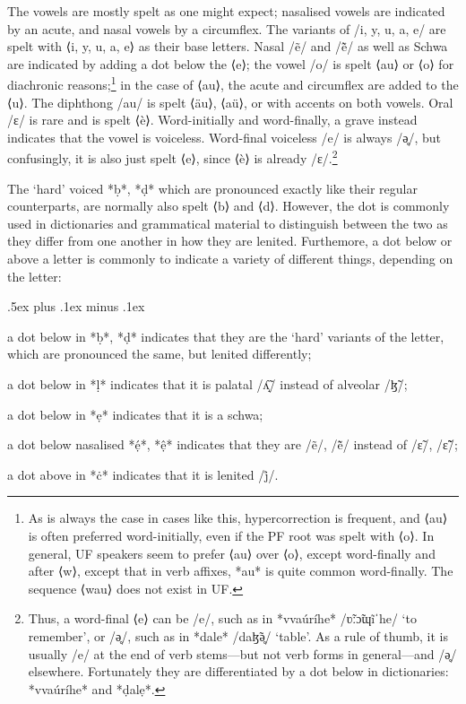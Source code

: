 \documentclass[a4paper, 12pt, oneside, final]{article}
\begin{document}
The vowels are mostly spelt as one might expect; nasalised vowels are indicated by an acute, and nasal vowels by a circumflex.
The variants of /i, y, u, a, e/ are spelt with ⟨i, y, u, a, e⟩ as their base letters. Nasal /ẽ/ and /ẽ̃/ as well as Schwa are
indicated by adding a dot below the ⟨e⟩; the vowel /o/ is spelt ⟨au⟩ or ⟨o⟩ for diachronic reasons;\footnote{As is always the
case in cases like this, hypercorrection is frequent, and ⟨au⟩ is often preferred word-initially, even if the
PF root was spelt with ⟨o⟩. In general, UF speakers seem to prefer ⟨au⟩ over ⟨o⟩, except word-finally and after ⟨w⟩, except
that in verb affixes, *au* is quite common word-finally. The sequence ⟨wau⟩ does not exist in UF.} in the case of
⟨au⟩, the acute and circumflex are added to the ⟨u⟩. The diphthong /au/ is spelt ⟨äu⟩, ⟨aü⟩, or with accents on both vowels. Oral
/ɛ/ is rare and is spelt ⟨è⟩. Word-initially and word-finally, a grave instead indicates that the vowel is voiceless. Word-final
voiceless /e/ is always /ə̥/, but confusingly, it is also just spelt ⟨e⟩, since ⟨è⟩ is already /ɛ/.\footnote{Thus, a word-final ⟨e⟩
can be /e/, such as in *vvaúríhe* /ʋ̃ːɔ̃ɰĩˈhe/ ‘to remember’, or /ə̥/, such as in *dale* /daɮ̃ə̥/ ‘table’. As a rule of thumb, it is
usually /e/ at the end of verb stems—but not verb forms in general—and /ə̥/ elsewhere. Fortunately they are differentiated by a
dot below in dictionaries: *vvaúríhe* and *ḍalẹ*.}

The ‘hard’ voiced *ḅ*, *ḍ* which are pronounced exactly like their regular counterparts, are normally also spelt ⟨b⟩ and
⟨d⟩. However, the dot is commonly used in dictionaries and grammatical material to distinguish between the two
as they differ from one another in how they are lenited. Furthemore, a dot below or above a letter is commonly to indicate
a variety of different things, depending on the letter:
\begin{items}\itemsep .5ex plus .1ex minus .1ex\relax
\item a dot below in *ḅ*, *ḍ* indicates that they are the ‘hard’ variants of the letter, which are pronounced
      the same, but lenited differently;
\item a dot below in *ḷ* indicates that it is palatal /ʎ̝̃/ instead of alveolar /ɮ̃/;
\item a dot below in *ẹ* indicates that it is a schwa;
\item a dot below nasalised *ẹ́*, *ệ* indicates that they are /ẽ/, /ẽ̃/ instead of /ɛ̃/, /ɛ̃̃/;
\item a dot above in *ċ* indicates that it is lenited /j̊/.
\end{items}
\end{document}
